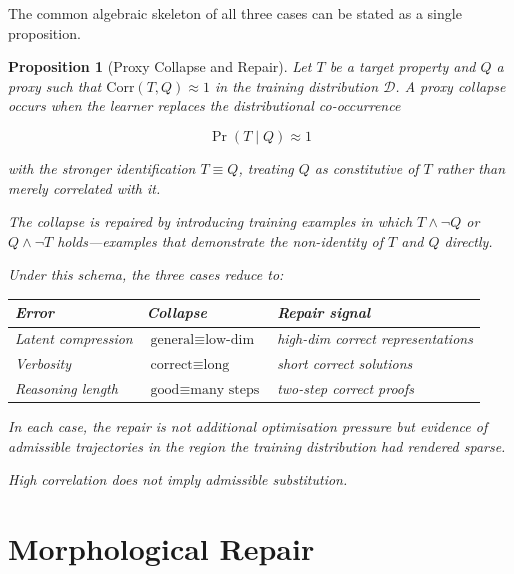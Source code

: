 \documentclass[11pt]{article}
\theoremstyle{rthm}
\newtheorem{proposition}[theorem]{Proposition}
\theoremstyle{rdef}
\theoremstyle{remark}
\begin{document}
\medskip

The common algebraic skeleton of all three cases can be stated
as a single proposition.

\begin{proposition}[Proxy Collapse and Repair]
\label{prop:proxy}
Let $T$ be a target property and $Q$ a proxy such that
$\mathrm{Corr}(T, Q) \approx 1$ in the training distribution
$\mathcal{D}$. A \emph{proxy collapse} occurs when the learner
replaces the distributional co-occurrence

\[
\Pr(T \mid Q) \approx 1
\]

with the stronger identification $T \equiv Q$, treating $Q$ as
constitutive of $T$ rather than merely correlated with it.

The collapse is repaired by introducing training examples in
which $T \land \neg Q$ or $Q \land \neg T$ holds---examples that
demonstrate the non-identity of $T$ and $Q$ directly.

Under this schema, the three cases reduce to:

\medskip
\begin{center}
\renewcommand{\arraystretch}{1.3}
\begin{tabular}{lll}
\toprule
\textbf{Error} & \textbf{Collapse} & \textbf{Repair signal} \\
\midrule
Latent compression & $\text{general} \equiv \text{low-dim}$ &
  high-dim correct representations \\
Verbosity & $\text{correct} \equiv \text{long}$ &
  short correct solutions \\
Reasoning length & $\text{good} \equiv \text{many steps}$ &
  two-step correct proofs \\
\bottomrule
\end{tabular}
\end{center}
\medskip

In each case, the repair is not additional optimisation pressure
but evidence of admissible trajectories in the region the
training distribution had rendered sparse.

High correlation does not imply admissible substitution.
\end{proposition}

\section{Morphological Repair}
\label{sec:repair}
\end{document}

